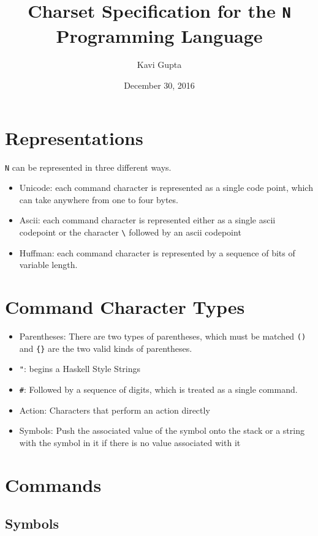 \documentclass{article}
\author{Kavi Gupta}
\date{December 30, 2016}
\title{Charset Specification for the \texttt{N} Programming Language}
\newcommand\escape\textbackslash
\begin{document}
\maketitle

\section{Representations}

\texttt N can be represented in three different ways.

\begin{itemize}
    \item Unicode: each command character is represented as a single code point, which can take
        anywhere from one to four bytes.
    \item Ascii: each command character is represented either as a single ascii codepoint or the
        character \texttt{\escape} followed by an ascii codepoint
    \item Huffman: each command character is represented by a sequence of bits of variable length.
\end{itemize}

\section{Command Character Types}

\begin{itemize}
    \item Parentheses: There are two types of parentheses, which must be matched \texttt{()}
        and \texttt{\{\}} are the two valid kinds of parentheses.
    \item \texttt{"}: begins a Haskell Style Strings
    \item \texttt{\#}: Followed by a sequence of digits, which is treated as a single command.
    \item Action: Characters that perform an action directly
    \item Symbols: Push the associated value of the symbol onto the stack or a string with the
        symbol in it if there is no value associated with it
\end{itemize}

\section{Commands}

\subsection{Symbols}
\end{document}

